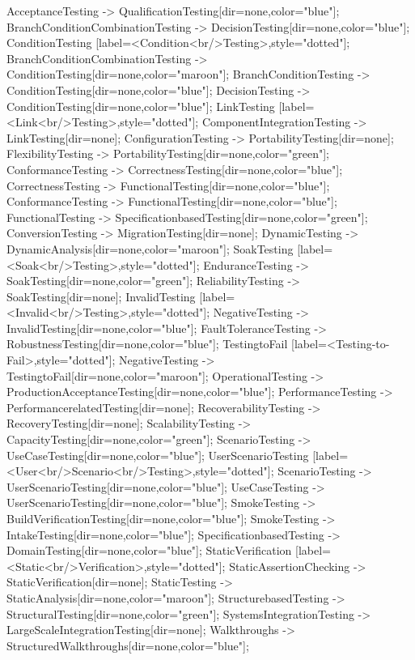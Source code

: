 \documentclass{article}
\begin{document}
{AcceptanceTesting -> QualificationTesting[dir=none,color="blue"];
BranchConditionCombinationTesting -> DecisionTesting[dir=none,color="blue"];
ConditionTesting [label=<Condition<br/>Testing>,style="dotted"];
BranchConditionCombinationTesting -> ConditionTesting[dir=none,color="maroon"];
BranchConditionTesting -> ConditionTesting[dir=none,color="blue"];
DecisionTesting -> ConditionTesting[dir=none,color="blue"];
LinkTesting [label=<Link<br/>Testing>,style="dotted"];
ComponentIntegrationTesting -> LinkTesting[dir=none];
ConfigurationTesting -> PortabilityTesting[dir=none];
FlexibilityTesting -> PortabilityTesting[dir=none,color="green"];
ConformanceTesting -> CorrectnessTesting[dir=none,color="blue"];
CorrectnessTesting -> FunctionalTesting[dir=none,color="blue"];
ConformanceTesting -> FunctionalTesting[dir=none,color="blue"];
FunctionalTesting -> SpecificationbasedTesting[dir=none,color="green"];
ConversionTesting -> MigrationTesting[dir=none];
DynamicTesting -> DynamicAnalysis[dir=none,color="maroon"];
SoakTesting [label=<Soak<br/>Testing>,style="dotted"];
EnduranceTesting -> SoakTesting[dir=none,color="green"];
ReliabilityTesting -> SoakTesting[dir=none];
InvalidTesting [label=<Invalid<br/>Testing>,style="dotted"];
NegativeTesting -> InvalidTesting[dir=none,color="blue"];
FaultToleranceTesting -> RobustnessTesting[dir=none,color="blue"];
TestingtoFail [label=<Testing-to-Fail>,style="dotted"];
NegativeTesting -> TestingtoFail[dir=none,color="maroon"];
OperationalTesting -> ProductionAcceptanceTesting[dir=none,color="blue"];
PerformanceTesting -> PerformancerelatedTesting[dir=none];
RecoverabilityTesting -> RecoveryTesting[dir=none];
ScalabilityTesting -> CapacityTesting[dir=none,color="green"];
ScenarioTesting -> UseCaseTesting[dir=none,color="blue"];
UserScenarioTesting [label=<User<br/>Scenario<br/>Testing>,style="dotted"];
ScenarioTesting -> UserScenarioTesting[dir=none,color="blue"];
UseCaseTesting -> UserScenarioTesting[dir=none,color="blue"];
SmokeTesting -> BuildVerificationTesting[dir=none,color="blue"];
SmokeTesting -> IntakeTesting[dir=none,color="blue"];
SpecificationbasedTesting -> DomainTesting[dir=none,color="blue"];
StaticVerification [label=<Static<br/>Verification>,style="dotted"];
StaticAssertionChecking -> StaticVerification[dir=none];
StaticTesting -> StaticAnalysis[dir=none,color="maroon"];
StructurebasedTesting -> StructuralTesting[dir=none,color="green"];
SystemsIntegrationTesting -> LargeScaleIntegrationTesting[dir=none];
Walkthroughs -> StructuredWalkthroughs[dir=none,color="blue"];

}
\end{document}

